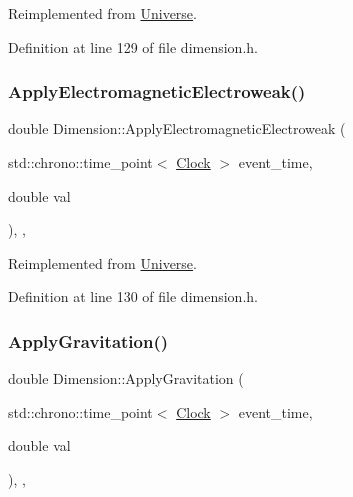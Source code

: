 Reimplemented from \mbox{\hyperlink{class_universe_a1f787da78fa196ba635db21a9e91dabb}{Universe}}.



Definition at line 129 of file dimension.\+h.

\mbox{\label{class_dimension_ab13e8ed50a4373274636e542c917db01}} 
\subsubsection{\texorpdfstring{Apply\+Electromagnetic\+Electroweak()}{ApplyElectromagneticElectroweak()}}
{\footnotesize\ttfamily double Dimension\+::\+Apply\+Electromagnetic\+Electroweak (\begin{DoxyParamCaption}\item[{std\+::chrono\+::time\+\_\+point$<$ \mbox{\hyperlink{universe_8h_a0ef8d951d1ca5ab3cfaf7ab4c7a6fd80}{Clock}} $>$}]{event\+\_\+time,  }\item[{double}]{val }\end{DoxyParamCaption})\hspace{0.3cm}{\ttfamily [inline]}, {\ttfamily [final]}, {\ttfamily [virtual]}}



Reimplemented from \mbox{\hyperlink{class_universe_a4c36c1ab30db993307f88363dde5e8c5}{Universe}}.



Definition at line 130 of file dimension.\+h.

\mbox{\label{class_dimension_a9474b0dd3f6321a92bfe4375bb4b2266}} 
\subsubsection{\texorpdfstring{Apply\+Gravitation()}{ApplyGravitation()}}
{\footnotesize\ttfamily double Dimension\+::\+Apply\+Gravitation (\begin{DoxyParamCaption}\item[{std\+::chrono\+::time\+\_\+point$<$ \mbox{\hyperlink{universe_8h_a0ef8d951d1ca5ab3cfaf7ab4c7a6fd80}{Clock}} $>$}]{event\+\_\+time,  }\item[{double}]{val }\end{DoxyParamCaption})\hspace{0.3cm}{\ttfamily [inline]}, {\ttfamily [final]}, {\ttfamily [virtual]}}



